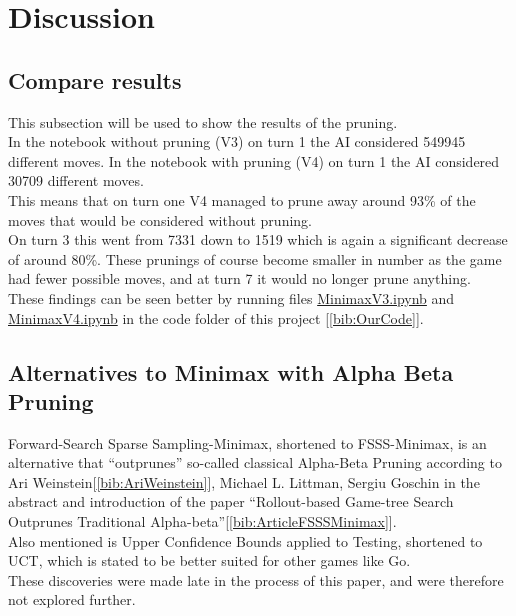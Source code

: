 \section{Discussion} 
\label{sec:Discussion}

\subsection{Compare results}
This subsection will be used to show the results of the pruning.\\
In the notebook without pruning (V3) on turn 1 the AI considered 549945 different moves.
In the notebook with pruning (V4) on turn 1 the AI considered 30709 different moves.\\
This means that on turn one V4 managed to prune away around 93\% of the moves that would be considered without pruning.\\
On turn 3 this went from 7331 down to 1519 which is again a significant decrease of around 80\%.
These prunings of course become smaller in number as the game had fewer possible moves, and at turn 7 it would no longer prune anything.\\
These findings can be seen better by running files \href{https://github.com/FrederikBlem/UFO_Exam_Minimax_Paper/blob/main/code/TicTacToe_MinimaxV3.ipynb}{MinimaxV3.ipynb} 
and \href{https://github.com/FrederikBlem/UFO_Exam_Minimax_Paper/blob/main/code/TicTacToe_MinimaxV4.ipynb}{MinimaxV4.ipynb} in the code folder of this project [\ref{bib:OurCode}].

\subsection{Alternatives to Minimax with Alpha Beta Pruning}
Forward-Search Sparse Sampling-Minimax, shortened to FSSS-Minimax, 
is an alternative that “outprunes” so-called classical Alpha-Beta Pruning according to Ari Weinstein[\ref{bib:AriWeinstein}], 
Michael L. Littman, Sergiu Goschin in the abstract and introduction of the paper “Rollout-based Game-tree Search Outprunes Traditional Alpha-beta”[\ref{bib:ArticleFSSSMinimax}].\\
Also mentioned is Upper Confidence Bounds applied to Testing, shortened to UCT, which is stated to be better suited for other games like Go.\\
These discoveries were made late in the process of this paper, and were therefore not explored further.

